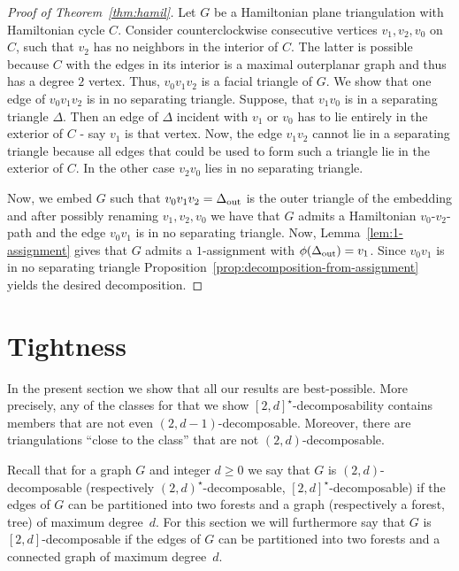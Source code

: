 \documentclass[a4paper,10pt]{article}
\theoremstyle{plain}
\begin{document}
\begin{proof}[Proof of Theorem~\ref{thm:hamil}]
 Let $G$ be a Hamiltonian plane triangulation with Hamiltonian cycle $C$. Consider counterclockwise consecutive vertices $v_1, v_2, v_0$ on $C$, such that $v_2$ has no neighbors in the interior of $C$. The latter is possible because $C$ with the edges in its interior is a maximal outerplanar graph and thus has a degree $2$ vertex. Thus, $v_0v_1v_2$ is a facial triangle of $G$. We show that one edge of $v_0v_1v_2$ is in no separating triangle. Suppose, that $v_1v_0$ is in a separating triangle $\Delta$. Then an edge of $\Delta$ incident with $v_1$ or $v_0$ has to lie entirely in the exterior of $C$ - say $v_1$ is that vertex. Now, the edge $v_1v_2$ cannot lie in a separating triangle because all edges that could be used to form such a triangle lie in the exterior of $C$. In the other case $v_2v_0$ lies in no separating triangle.
 
 Now, we embed $G$ such that $v_0v_1v_2=\Delta_{\rm out}$ is the outer triangle of the embedding and after possibly renaming $v_1, v_2, v_0$ we have that $G$ admits a Hamiltonian $v_0$-$v_2$-path and the edge $v_0v_1$ is in no separating triangle. Now, Lemma~\ref{lem:1-assignment} gives that $G$ admits a $1$-assignment with $\phi(\Delta_{\rm out}) = v_1$. Since $v_0v_1$ is in no separating triangle Proposition~\ref{prop:decomposition-from-assignment} yields the desired decomposition.
\end{proof}


















\section{Tightness}\label{sec:tight}
In the present section we show that all our results are best-possible. More precisely, any of the classes for that we show $[2,d]^\star$-decomposability contains members that are not even $(2,d-1)$-decomposable. Moreover, there are triangulations ``close to the class'' that are not $(2,d)$-decomposable.

Recall that for a graph $G$ and integer $d \geq 0$ we say that $G$ is $(2,d)$-decomposable (respectively $(2,d)^\star$-decomposable, $[2,d]^\star$-decomposable) if the edges of $G$ can be partitioned into two forests and a graph (respectively a forest, tree) of maximum degree~$d$. For this section we will furthermore say that $G$ is $[2,d]$-decomposable if the edges of $G$ can be partitioned into two forests and a connected graph of maximum degree~$d$.
\end{document}
